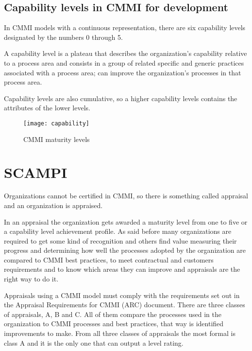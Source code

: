 \subsection{Capability levels in CMMI for development}

In CMMI models with a continuous representation, there are six capability levels designated by the numbers 0 through 5.

A capability level is a plateau that describes the organization's capability relative to a process area and consists in a group of related specific and generic practices associated with a process area; can improve the organization's processes in that process area.

Capability levels are also cumulative, so a higher capability levels contains the attributes of the lower levels.

\begin{figure}[h]
	\begin{center}
		\leavevmode
		\texttt{[image: capability]}
		\caption{CMMI maturity levels}
		\label{fig:capabilitylevels}
	\end{center}
\end{figure}


\section{SCAMPI}
Organizations cannot be certified in CMMI, so there is something called appraisal and an organization is appraised.

In an appraisal the organization gets awarded a maturity level from one to five or a capability level achievement profile. As said before many organizations are required to get some kind of recognition and others find value measuring their progress and determining how well the processes adopted by the organization are compared to CMMI best practices, to meet contractual and customers requirements and to know which areas they can improve and appraisals are the right way to do it.

Appraisals using a CMMI model must comply with the requirements set out in the Appraisal Requirements for CMMI (ARC) document. There are three classes of appraisals, A, B and C. All of them compare the processes used in the organization to CMMI processes and best practices, that way is identified improvements to make. From all three classes of appraisals the most formal is class A and it is the only one that can output a level rating.

